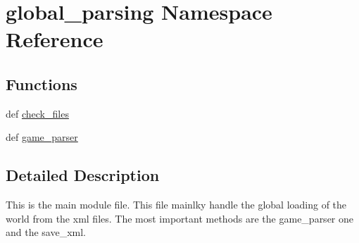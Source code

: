 \hypertarget{namespaceglobal__parsing}{\section{global\-\_\-parsing \-Namespace \-Reference}
\label{namespaceglobal__parsing}
}
\subsection*{\-Functions}
\begin{DoxyCompactItemize}
\item 
def \hyperlink{namespaceglobal__parsing_a5d95c807e9a039c8f637e766c44015b3}{check\-\_\-files}
\item 
def \hyperlink{namespaceglobal__parsing_a836047f47212ff1c3cc4f874d8bd69e0}{game\-\_\-parser}
\end{DoxyCompactItemize}


\subsection{\-Detailed \-Description}
\begin{DoxyVerb}
This is the main module file.
This file mainlky handle the global loading of the world from the xml files.
The most important methods are the game_parser one and the save_xml.
\end{DoxyVerb}
 

